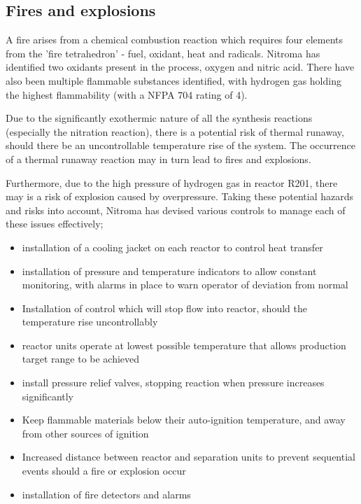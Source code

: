                          


\subsection{Fires and explosions}

A fire arises from a chemical combustion reaction which requires four elements from the 'fire tetrahedron' - fuel, oxidant, heat and radicals. Nitroma has identified two oxidants present in the process, oxygen and nitric acid. There have also been multiple flammable substances identified, with hydrogen gas holding the highest flammability (with a NFPA 704 rating of 4). 

Due to the significantly exothermic nature of all the synthesis reactions (especially the nitration reaction), there is a potential risk of thermal runaway, should there be an uncontrollable temperature rise of the system. The occurrence of a thermal runaway reaction may in turn lead to fires and explosions.  

Furthermore, due to the high pressure of hydrogen gas in reactor R201, there may is a risk of explosion caused by overpressure. Taking these potential hazards and risks into account, Nitroma has devised various controls to manage each of these issues effectively; 


\begin{itemize}
    \item installation of a cooling jacket on each reactor to control heat transfer
    \item installation of pressure and temperature indicators to allow constant monitoring, with alarms in place to warn operator of deviation from normal
    \item Installation of control which will stop flow into reactor, should the temperature rise uncontrollably
    \item reactor units operate at lowest possible temperature that allows production target range to be achieved
    \item install pressure relief valves, stopping reaction when pressure increases significantly 
    \item Keep flammable materials below their auto-ignition temperature, and away from other sources of ignition
    \item Increased distance between reactor and separation units to prevent sequential events should a fire or explosion occur
    \item installation of fire detectors and alarms
    
\end{itemize}


